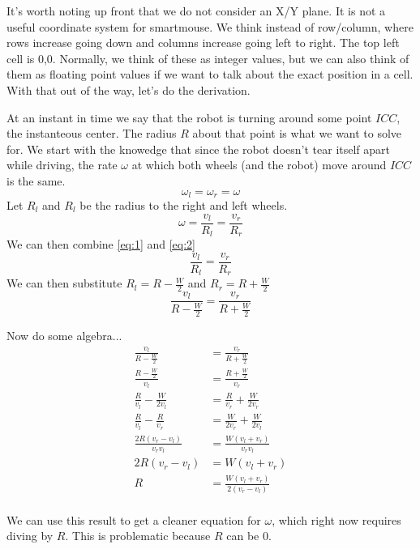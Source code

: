 \documentclass{article}
\begin{document}
It's worth noting up front that we do not consider an X/Y plane. It is not a useful coordinate system for smartmouse. We think instead of row/column, where rows increase going down and columns increase going left to right. The top left cell is 0,0. Normally, we think of these as integer values, but we can also think of them as floating point values if we want to talk about the exact position in a cell. With that out of the way, let's do the derivation.

At an instant in time we say that the robot is turning around some point $ICC$, the instanteous center. The radius $R$ about that point is what we want to solve for. We start with the knowedge that since the robot doesn't tear itself apart while driving, the rate $\omega$ at which both wheels (and the robot) move around $ICC$ is the same.
\begin{equation} \label{eq:1}
  \omega_l = \omega_r = \omega
\end{equation}
Let $R_l$ and $R_l$ be the radius to the right and left wheels.
\begin{equation} \label{eq:2}
  \omega = \frac{v_l}{R_l} = \frac{v_r}{R_r}
\end{equation}
We can then combine \ref{eq:1} and \ref{eq:2}
\begin{equation}
  \frac{v_l}{R_l} = \frac{v_r}{R_r}
\end{equation}
We can then substitute $R_l = R - \frac{W}{2}$ and $R_r = R + \frac{W}{2}$
\begin{equation}
  \frac{v_l}{R-\frac{W}{2}} = \frac{v_r}{R + \frac{W}{2}}
\end{equation}

Now do some algebra...
\begin{align*}
  \frac{v_l}{R-\frac{W}{2}} &= \frac{v_r}{R + \frac{W}{2}} \\[1em]
  \frac{R-\frac{W}{2}}{v_l} &= \frac{R + \frac{W}{2}}{v_r} \\[1em]
  \frac{R}{v_l}-\frac{W}{2v_l} &= \frac{R}{v_r} + \frac{W}{2v_r} \\[1em]
  \frac{R}{v_l}-\frac{R}{v_r} &= \frac{W}{2v_r}+\frac{W}{2v_l} \\[1em]
  \frac{2R(v_r-v_l)}{v_rv_l} &= \frac{W(v_l+v_r)}{v_rv_l} \\[1em]
  2R(v_r-v_l) &= W(v_l+v_r) \\[1em]
  R &= \frac{W(v_l+v_r)}{2(v_r-v_l)} \\[1em]
\end{align*}

We can use this result to get a cleaner equation for $\omega$, which right now requires diving by $R$. This is problematic because $R$ can be $0$.
\end{document}
